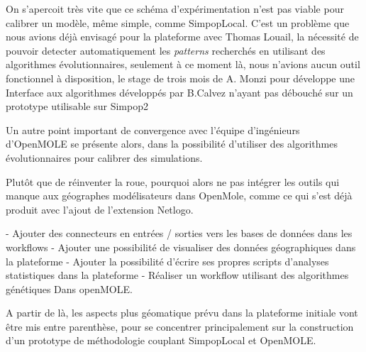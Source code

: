 On s'apercoit très vite que ce schéma d'expérimentation n'est pas viable pour calibrer un modèle, même simple, comme SimpopLocal. C'est un problème que nous avions déjà envisagé pour la plateforme avec Thomas Louail, la nécessité de pouvoir detecter automatiquement les \textit{patterns} recherchés en utilisant des algorithmes évolutionnaires, seulement à ce moment là, nous n'avions aucun outil fonctionnel à disposition, le stage de trois mois de A. Monzi pour développe une Interface aux algorithmes développés par B.Calvez n'ayant pas débouché sur un prototype utilisable sur Simpop2 \autocite[140-141]{Louail2010}

Un autre point important de convergence avec l'équipe d'ingénieurs d'OpenMOLE se présente alors, dans la possibilité d'utiliser des algorithmes évolutionnaires pour calibrer des simulations. 

Plutôt que de réinventer la roue, pourquoi alors ne pas intégrer les outils qui manque aux géographes modélisateurs dans OpenMole, comme ce qui s'est déjà produit avec l'ajout de l'extension Netlogo.

- Ajouter des connecteurs en entrées / sorties vers les bases de données dans les workflows
- Ajouter une possibilité de visualiser des données géographiques dans la plateforme 
- Ajouter la possibilité d'écrire ses propres scripts d'analyses statistiques dans la plateforme
- Réaliser un workflow utilisant des algorithmes génétiques Dans openMOLE.

A partir de là, les aspects plus géomatique prévu dans la plateforme initiale vont être mis entre parenthèse, pour se concentrer principalement sur la construction d'un prototype de méthodologie couplant SimpopLocal et OpenMOLE.







